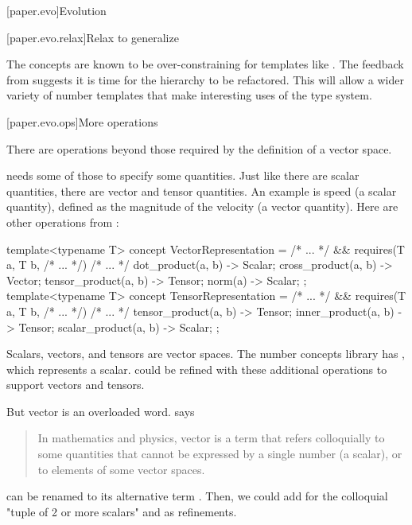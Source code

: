 

[paper.evo]{Evolution}

[paper.evo.relax]{Relax to generalize}

\pnum
The concepts are known to be over-constraining for templates like .
The feedback from \hrefVII{} suggests it is time for the hierarchy to be refactored.
This will allow a wider variety of number templates that make interesting uses of the type system.

[paper.evo.ops]{More operations}

\pnum
There are operations beyond those required by the definition of a vector space.

\pnum
{} needs some of those to specify some quantities.
Just like there are scalar quantities, there are vector and tensor quantities.
An example is speed (a scalar quantity),
defined as the magnitude of the velocity (a vector quantity).
Here are other operations from \hrefXI{}:
\begin{codeblock}
template<typename T>
concept VectorRepresentation = /* ... */ &&
  requires(T a, T b, /* ... */) {
    /* ... */
    { dot_product(a, b) } -> Scalar;
    { cross_product(a, b) } -> Vector;
    { tensor_product(a, b) } -> Tensor;
    { norm(a) } -> Scalar;
  };
template<typename T>
concept TensorRepresentation = /* ... */ &&
  requires(T a, T b, /* ... */) {
    /* ... */
    { tensor_product(a, b) } -> Tensor;
    { inner_product(a, b) } -> Tensor;
    { scalar_product(a, b) } -> Scalar;
  };
\end{codeblock}

\pnum
Scalars, vectors, and tensors are vector spaces.
The number concepts library has , which represents a scalar.
 could be refined with these additional operations to support vectors and tensors.

\pnum
But vector is an overloaded word.
 says
\begin{quote}
In mathematics and physics,
vector is a term that refers colloquially to some quantities
that cannot be expressed by a single number (a scalar),
or to elements of some vector spaces.
\end{quote}
 can be renamed to its alternative term .
Then, we could add  for the colloquial "tuple of 2 or more scalars" and  as refinements.

